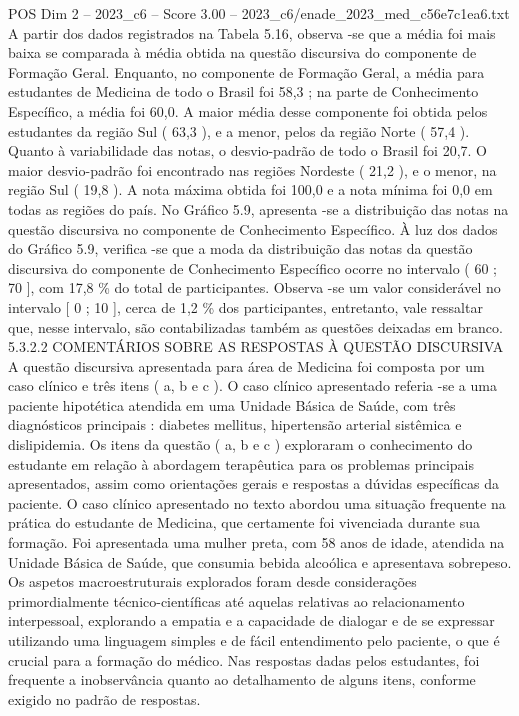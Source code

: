 \begin{textsample}{POS Dim 2 – 2023\_c6 – Score 3.00 – 2023\_c6/enade\_2023\_med\_c56e7c1ea6.txt}
A partir dos dados registrados na Tabela 5.16, observa -se que a média foi mais baixa se comparada à média obtida na questão discursiva do componente de Formação Geral.
Enquanto, no componente de Formação Geral, a média para estudantes de Medicina de todo o Brasil foi 58,3 ; na parte de Conhecimento Específico, a média foi 60,0.
A maior média desse componente foi obtida pelos estudantes da região Sul ( 63,3 ), e a menor, pelos da região Norte ( 57,4 ).
Quanto à variabilidade das notas, o desvio-padrão de todo o Brasil foi 20,7.
O maior desvio-padrão foi encontrado nas regiões Nordeste ( 21,2 ), e o menor, na região Sul ( 19,8 ).
A nota máxima obtida foi 100,0 e a nota mínima foi 0,0 em todas as regiões do país.
No Gráfico 5.9, apresenta -se a distribuição das notas na questão discursiva no componente de Conhecimento Específico.
À luz dos dados do Gráfico 5.9, verifica -se que a moda da distribuição das notas da questão discursiva do componente de Conhecimento Específico ocorre no intervalo ( 60 ; 70 ], com 17,8 \% do total de participantes.
Observa -se um valor considerável no intervalo [ 0 ; 10 ], cerca de 1,2 \% dos participantes, entretanto, vale ressaltar que, nesse intervalo, são contabilizadas também as questões deixadas em branco. 5.3.2.2 COMENTÁRIOS SOBRE AS RESPOSTAS À QUESTÃO DISCURSIVA A questão discursiva apresentada para área de Medicina foi composta por um caso clínico e três itens ( a, b e c ).
O caso clínico apresentado referia -se a uma paciente hipotética atendida em uma Unidade Básica de Saúde, com três diagnósticos principais : diabetes mellitus, hipertensão arterial sistêmica e dislipidemia.
Os itens da questão ( a, b e c ) exploraram o conhecimento do estudante em relação à abordagem terapêutica para os problemas principais apresentados, assim como orientações gerais e respostas a dúvidas específicas da paciente.
O caso clínico apresentado no texto abordou uma situação frequente na prática do estudante de Medicina, que certamente foi vivenciada durante sua formação.
Foi apresentada uma mulher preta, com 58 anos de idade, atendida na Unidade Básica de Saúde, que consumia bebida alcoólica e apresentava sobrepeso.
Os aspetos macroestruturais explorados foram desde considerações primordialmente técnico-científicas até aquelas relativas ao relacionamento interpessoal, explorando a empatia e a capacidade de dialogar e de se expressar utilizando uma linguagem simples e de fácil entendimento pelo paciente, o que é crucial para a formação do médico.
Nas respostas dadas pelos estudantes, foi frequente a inobservância quanto ao detalhamento de alguns itens, conforme exigido no padrão de respostas.

\end{textsample}
